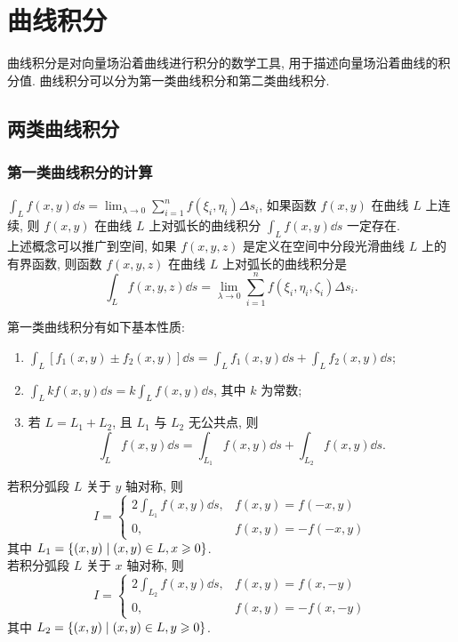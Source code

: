 \section{曲线积分}

曲线积分是对向量场沿着曲线进行积分的数学工具, 用于描述向量场沿着曲线的积分值. 曲线积分可以分为第一类曲线积分和第二类曲线积分.

\subsection{两类曲线积分}

\subsubsection{第一类曲线积分的计算}

\begin{definition}
    $\displaystyle\int_L f(x,y)\dd s=\lim_{\lambda\to0}\sum_{i=1}^{n}f(\xi_i,\eta_i)\Delta s_i$, 如果函数 $f(x,y)$ 在曲线 $L$ 上连续,
    则 $f(x,y)$ 在曲线 $L$ 上对弧长的曲线积分 $\displaystyle\int_L f(x,y)\dd s$ 一定存在.\\
    上述概念可以推广到空间, 如果 $f(x,y,z)$ 是定义在空间中分段光滑曲线 $L$ 上的有界函数, 则函数 $f(x,y,z)$ 在曲线 $L$ 上对弧长的曲线积分是
    $$\int_Lf(x,y,z)\dd s=\lim_{\lambda\to0}\sum_{i=1}^{n}f(\xi_i,\eta_i,\zeta_i)\Delta s_i.$$
\end{definition}

\begin{theorem}
    第一类曲线积分有如下基本性质:
    \begin{enumerate}[label=(\arabic{*})]
        \item $\displaystyle\int_L [f_1(x,y)\pm f_2(x,y)]\dd s=\int_L f_1(x,y)\dd s+\int_L f_2(x,y)\dd s$;
        \item $\displaystyle\int_L kf(x,y)\dd s=k\int_L f(x,y)\dd s$, 其中 $k$ 为常数;
        \item 若 $L=L_1+L_2$, 且 $L_1$ 与 $L_2$ 无公共点, 则 $$\int_Lf(x,y)\dd s=\int_{L_1}f(x,y)\dd s+\int_{L_2}f(x,y)\dd s. $$
    \end{enumerate}
\end{theorem}

\begin{theorem}[轴对称性]
    若积分弧段 $L$ 关于 $y$ 轴对称, 则
    $$I=\begin{cases}
            2\displaystyle \int_{L_1}f(x,y)\dd s, & f(x,y)=f(-x,y)  \\
            0,                                    & f(x,y)=-f(-x,y)
        \end{cases}$$
    其中 $L_1=\qty{(x,y)\mid (x,y)\in L,x\geqslant 0}$.\\
    若积分弧段 $L$ 关于 $x$ 轴对称, 则
    $$I=\begin{cases}
            2\displaystyle\int_{L_2}f(x,y)\dd s, & f(x,y)=f(x,-y)  \\
            0,                                   & f(x,y)=-f(x,-y)
        \end{cases}$$
    其中 $L_2=\qty{(x,y)\mid (x,y)\in L,y\geqslant 0}$.
\end{theorem}

